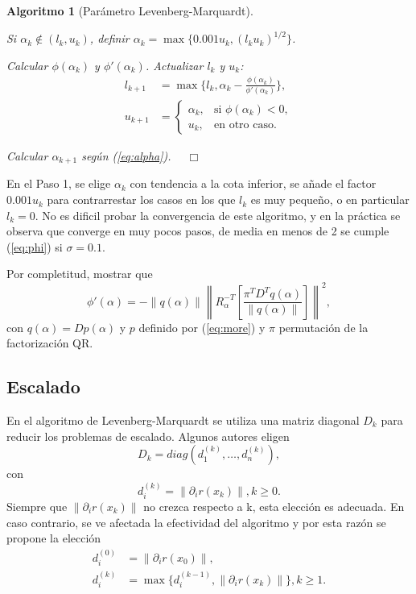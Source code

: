 \documentclass[11pt,a4paper]{book}
\newtheorem{algorithm}[theorem]{Algoritmo}
\theoremstyle{definition}
\theoremstyle{remark}
\newcommand{\norm}[1]{\left\lVert#1\right\rVert}
\begin{document}
\begin{algorithm}[Parámetro Levenberg-Marquardt]\leavevmode
	\begin{steps}
		\item Si $\alpha_k \notin (l_k, u_k)$, definir $\alpha_k = \max \{0.001u_k, (l_ku_k)^{1/2}\}$.	
		\item Calcular $\phi(\alpha_k)$ y $\phi'(\alpha_k)$. Actualizar $l_k$ y $u_k$:
			\begin{align*}
				l_{k+1} &= \max \{l_k, \alpha_k-\frac{\phi(\alpha_k)}{\phi'(\alpha_k)}\}, \\
				u_{k+1} &= \begin{cases}
					\alpha_k, & \text{si } \phi(\alpha_k) < 0, \\
					u_k, & \text{en otro caso}.
				\end{cases}
			\end{align*}
		\item Calcular $\alpha_{k+1}$ según (\ref{eq:alpha}). $\quad \Box$
	\end{steps}
\end{algorithm}
En el Paso 1, se elige $\alpha_k$ con tendencia a la cota inferior, se añade el factor $0.001u_k$ para
contrarrestar los casos en los que $l_k$ es muy pequeño, o en particular $l_k=0$. No es dificil probar
la convergencia de este algoritmo, y en la práctica se observa que converge en muy pocos pasos,
de media en menos de 2 se cumple (\ref{eq:phi}) si $\sigma=0.1$.

Por completitud, mostrar que
\begin{equation}
	\phi'(\alpha)=-\norm{q(\alpha)} \norm{R_{\alpha}^{-T}\left[
		\frac{\pi^TD^Tq(\alpha)}{\norm{q(\alpha)}}
	 \right] }^2,
\end{equation}
con $q(\alpha)=Dp(\alpha)$ y $p$ definido por (\ref{eq:more}) y $\pi$ permutación de la
factorización QR.

\subsection{Escalado}
En el algoritmo de Levenberg-Marquardt se utiliza una matriz diagonal $D_k$ para
reducir los problemas de escalado.
Algunos autores eligen
\begin{equation}\label{eq:diag}
	D_k = diag(d_1^{(k)}, \ldots, d_n^{(k)}),
\end{equation}
con
\begin{equation}
	d_i^{(k)}=\norm{\partial_ir(x_k)}, k\geq 0.
\end{equation}
Siempre que $\norm{\partial_ir(x_k)}$ no crezca respecto a k, esta elección es adecuada. En caso contrario,
se ve afectada la efectividad del algoritmo y por esta razón se propone la elección
\begin{equation} \label{eq:di}
	\begin{split}
	d_i^{(0)} &= \norm{\partial_ir(x_0)}, \\
	d_i^{(k)} &= \max \{d_i^{(k-1)}, \norm{\partial_ir(x_k)}\}, k\geq 1.
	\end{split}
\end{equation}
\end{document}
